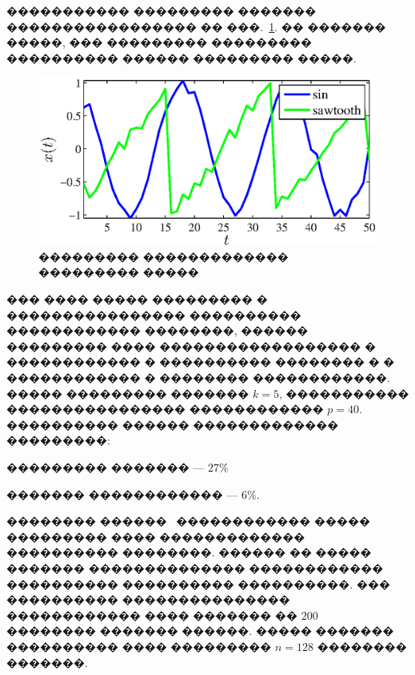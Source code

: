 \documentclass[12pt,twoside, notitlepage]{article}
\begin{document}
����������� ��������� ������� ����������������� �� ���.~\ref{centroids_synthetic}.
�� ������� �����, ��� ��������� ��������� ���������� ������ ��������� �����.
\begin{figure}[h]
\centering
    \includegraphics[width=0.45\linewidth]{fig/centroids_synthetic_noize}
    \caption{��������� ������������� ��������� �����}
\label{centroids_synthetic}
\end{figure}

��� ���� ����� ��������� � ���������������� ���������� ������������ ��������, ������
��������� ���� ������������������ � ������������ � ���������� �������� � � ������������ � �������� ������������.
����� ��������� ������� $k = 5$, ����������� ���������������� ������������ $p = 40$.
���������� ������ ������������� ���������:

��������� ������� --- $27\%$

������� ������������ --- $6\%$.

�������� ������~\cite{UCI_HarDataset} ������������ ����� ��������� ���� ������������� ���������� ��������.
������ �� ����� ������� �������������� ������������ ���������� ���������� ����������.
��� ���������� ��������������� ������������ ���� ������� �� $200$ �������� ������� ������.
����� ������� ���������� ���� ��������� $n = 128$ �������� �������.
\end{document}
